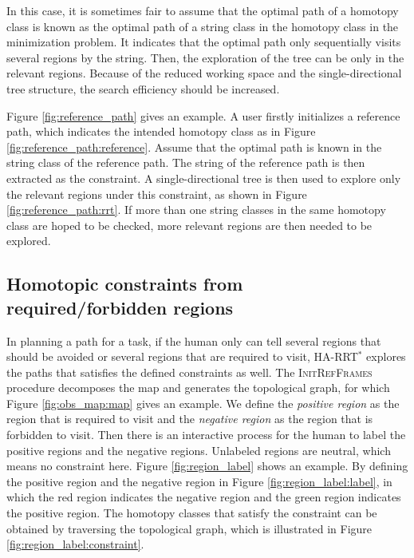 \documentclass[letterpaper, 10 pt, conference]{ieeeconf}
\begin{document}
In this case, it is sometimes fair to assume that the optimal path of a homotopy class is known as the optimal path of a string class in the homotopy class in the minimization problem.
It indicates that the optimal path only sequentially visits several regions by the string.
Then, the exploration of the tree can be only in the relevant regions.
Because of the reduced working space and the single-directional tree structure, the search efficiency should be increased.

Figure \ref{fig:reference_path} gives an example.
A user firstly initializes a reference path, which indicates the intended homotopy class as in Figure \ref{fig:reference_path:reference}.
Assume that the optimal path is known in the string class of the reference path.
The string of the reference path is then extracted as the constraint.
A single-directional tree is then used to explore only the relevant regions under this constraint, as shown in Figure \ref{fig:reference_path:rrt}.
If more than one string classes in the same homotopy class are hoped to be checked, more relevant regions are then needed to be explored.


\subsection{Homotopic constraints from required/forbidden regions}
\label{sec:region_constraint}

In planning a path for a task, if the human only can tell several regions that should be avoided or several regions that are required to visit, HA-RRT$^{*}$ explores the paths that satisfies the defined constraints as well.
The \textsc{InitRefFrames} procedure decomposes the map and generates the topological graph, for which Figure \ref{fig:obs_map:map} gives an example.
We define the \emph{positive region} as the region that is required to visit and the \emph{negative region} as the region that is forbidden to visit.
Then there is an interactive process for the human to label the positive regions and the negative regions.
Unlabeled regions are neutral, which means no constraint here.
Figure \ref{fig:region_label} shows an example.
By defining the positive region and the negative region in Figure \ref{fig:region_label:label}, in which the red region indicates the negative region and the green region indicates the positive region.
The homotopy classes that satisfy the constraint can be obtained by traversing the topological graph, which is illustrated in Figure \ref{fig:region_label:constraint}.
\end{document}

